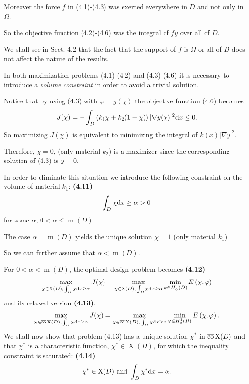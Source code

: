 \documentclass{book}
\numberwithin{equation}{section}
\begin{document}
\begin{enumerate}
    Moreover the force $f$ in (4.1)-(4.3) was exerted everywhere in $D$ and not only in $\Omega$.
    
    So the objective function (4.2)-(4.6) was the integral of $fy$ over all of $D$.
    
    We shall see in Sect. 4.2 that the fact that the support of $f$ is $\Omega$ or all of $D$ does not affect the nature of the results.
    
    In both maximization problems (4.1)-(4.2) and (4.3)-(4.6) it is necessary to introduce a \textit{volume constraint} in order to avoid a trivial solution.
    
    Notice that by using (4.3) with $\varphi = y(\chi)$ the objective function (4.6) becomes
    \begin{align*}
        J(\chi) = -\int_D \left(k_1\chi + k_2(1 - \chi)\right)|\nabla y(\chi)|^2{\rm d}x\le 0.
    \end{align*}
    So maximizing $J(\chi)$ is equivalent to minimizing the integral of $k(x)|\nabla y|^2$.
    
    Therefore, $\chi = 0$, (only material $k_2$) is a maximizer since the corresponding solution of (4.3) is $y = 0$.
    
    In order to eliminate this situation we introduce the following constraint on the volume of material $k_1$: \textbf{(4.11)}
    \begin{align*}
        \int_D \chi{\rm d}x\ge\alpha > 0
    \end{align*}
    for some $\alpha$, $0 < \alpha\le\operatorname{m}(D)$.
    
    The case $\alpha = \operatorname{m}(D)$ yields the unique solution $\chi = 1$ (only material $k_1$).
    
    So we can further assume that $\alpha < \operatorname{m}(D)$.
    
    For $0 < \alpha < \operatorname{m}(D)$, the optimal design problem becomes \textbf{(4.12)}
    \begin{align*}
        \max_{\chi\in\operatorname{X}(D),\,\int_D \chi{\rm d}x\ge\alpha} J(\chi) = \max_{\chi\in\operatorname{X}(D),\,\int_D \chi{\rm d}x\ge\alpha} \min_{\varphi\in H_0^1(D)} E\left(\chi,\varphi\right)
    \end{align*}
    and its relaxed version \textbf{(4.13)}:
    \begin{align*}
        \max_{\chi\in\overline{\rm co}\operatorname{X}(D),\,\int_D \chi{\rm d}x\ge\alpha} J(\chi) = \max_{\chi\in\overline{\rm co}\operatorname{X}(D),\,\int_D \chi{\rm d}x\ge\alpha} \min_{\varphi\in H_0^1(D)} E\left(\chi,\varphi\right).
    \end{align*}
    We shall now show that problem (4.13) has a unique solution $\chi^*$ in $\overline{\rm co}\operatorname{X}(D)$ and that $\chi^*$ is a characteristic function, $\chi^*\in\operatorname{X}(D)$, for which the inequality constraint is saturated: \textbf{(4.14)}
    \begin{align*}
        \chi^*\in\operatorname{X}(D) \mbox{ and } \int_D \chi^*{\rm d}x = \alpha.
    \end{align*}
    

\end{enumerate}
\end{document}
